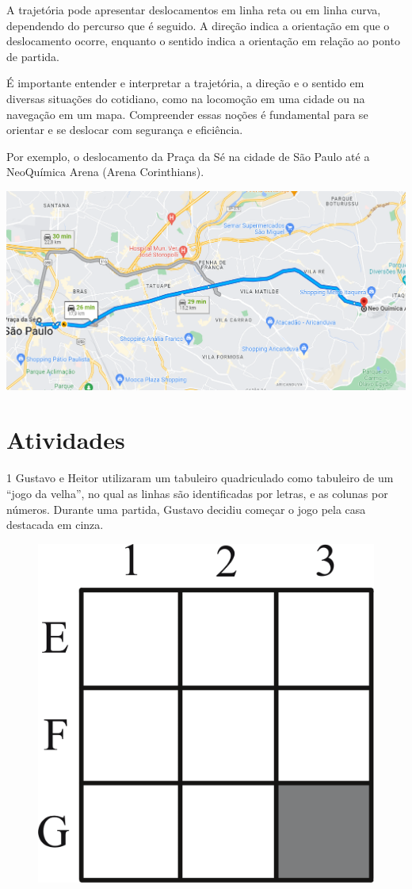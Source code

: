 {A trajetória pode apresentar deslocamentos em linha reta ou em linha
curva, dependendo do percurso que é seguido. A direção indica a
orientação em que o deslocamento ocorre, enquanto o sentido indica a
orientação em relação ao ponto de partida.

É importante entender e interpretar a trajetória, a direção e o sentido
em diversas situações do cotidiano, como na locomoção em uma cidade ou
na navegação em um mapa. Compreender essas noções é fundamental para se
orientar e se deslocar com segurança e eficiência.

Por exemplo, o deslocamento da Praça da Sé na cidade de São Paulo até a
NeoQuímica Arena (Arena Corinthians).

\includegraphics[width=\textwidth]{./_SAEB_9_MAT/media/image196.png}


}

\section*{Atividades}

\num{1} Gustavo e Heitor utilizaram um tabuleiro quadriculado como tabuleiro
de um ``jogo da velha'', no qual as linhas são identificadas por letras,
e as colunas por números. Durante uma partida, Gustavo decidiu começar
o jogo pela casa destacada em cinza.

\begin{figure}[htpb!]
\centering
\includegraphics[width=.25\textwidth]{./ilustras-mat/modulo_12-atividade_1.png}
\end{figure}

